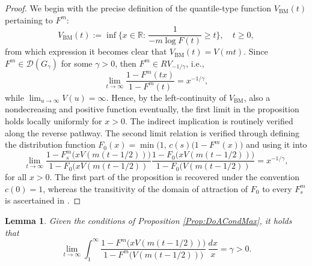 \documentclass[11pt, a4paper, oneside]{article}
\numberwithin{equation}{section}
\theoremstyle{plain}
\newtheorem{lem}[thm]{Lemma}
\theoremstyle{definition}
\newcommand{\field}[1]{\mathbb{#1}}
\newcommand{\real}{\ensuremath{{\field{R}}}}
\newcommand{\limit}[1]{\ensuremath{\displaystyle {\lim_{#1 \rightarrow{\infty}}}}}
\begin{document}
\begin{proof}
 We begin with the precise definition of the quantile-type function $V_{\textrm{BM}}(t)$ pertaining to $F^m$:
 \begin{equation*}
 	V_{\textrm{BM}}(t):= \inf \bigl\{ x \in \real : \, \frac{1}{- m \log F(t)} \geq t \bigr\}, \quad t \geq 0,
\end{equation*}
from which expression it becomes clear that $V_{\textrm{BM}}(t) = V(mt)$. Since $F^m \in \mathcal{D}(G_\gamma)$ for some $\gamma >0$, then $F^m \in RV_{-1/\gamma}$, i.e.,
\begin{equation*}
	\limit{t} \frac{1-F^m(tx)}{1-F^m(t)} = x^{-1/\gamma},
\end{equation*}
while $\lim_{u \rightarrow \infty} V(u) = \infty$. Hence, by the left-continuity of $V_{\textrm{BM}}$, also a nondecreasing and positive function eventually, the first limit in the proposition holds locally uniformly for $x >0$. The indirect implication is routinely verified along the reverse  pathway. The second limit relation is verified through defining the distribution function $F_0(x)= \min \bigl(1, \, c(s) (1-F^m(x)\bigr)$ and using it into
\begin{equation*}
	\limit{t} \frac{1-F_s^m\bigl( x V(m(t-1/2)) \bigr) }{1 - F_0 \bigl(x  V(m(t-1/2)) } \frac{1-F_0\bigl( x V(m(t-1/2)) \bigr) }{1 - F_0 \bigl( V(m(t-1/2)) } = x^{-1/\gamma},
\end{equation*}
for all $ x>0$. The first part of the proposition is recovered under the convention $c(0) =1$, whereas the transitivity of the domain of attraction of $F_0$ to every $F^m_s$ is ascertained in \citet[][p.143]{TailTrend15}.
\end{proof}
    
 
\begin{lem}\label{Lem:IntRVofFm}
Given the conditions of Proposition \ref{Prop:DoACondMax}, it holds that
\begin{equation*}
    \lim_{t\rightarrow \infty} \int_{1}^{\infty}\frac{1-F^m\bigl( x V(m(t-1/2)) \bigr) }{ 1 - F^m \bigl( V(m(t-1/2)) \bigr)}\, \frac{dx}{x} = \gamma >0.
\end{equation*}
\end{lem}
\end{document}
